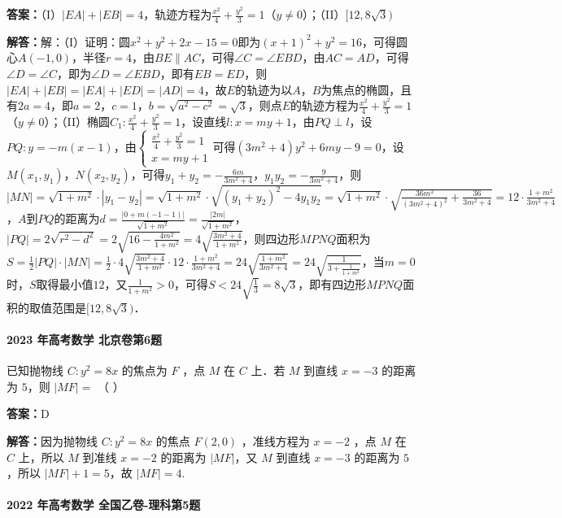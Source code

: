 \documentclass[UTF8,a4paper,11pt]{ctexart}
\begin{document}
\textbf{答案：}（I）$|EA|+|EB|=4$，轨迹方程为$\frac{x^2}{4}+\frac{y^2}{3}=1$（$y\neq0$）；（II）$[12,8\sqrt{3})$\par

\textbf{解答：}解：（I）证明：圆$x^2+y^2+2x-15=0$即为$(x+1)^2+y^2=16$，可得圆心$A(-1,0)$，半径$r=4$，由$BE\parallel AC$，可得$\angle C=\angle EBD$，由$AC=AD$，可得$\angle D=\angle C$，即为$\angle D=\angle EBD$，即有$EB=ED$，则$|EA|+|EB|=|EA|+|ED|=|AD|=4$，故$E$的轨迹为以$A$，$B$为焦点的椭圆，且有$2a=4$，即$a=2$，$c=1$，$b=\sqrt{a^2-c^2}=\sqrt{3}$，则点$E$的轨迹方程为$\frac{x^2}{4}+\frac{y^2}{3}=1$（$y\neq0$）；（II）椭圆$C_1:\frac{x^2}{4}+\frac{y^2}{3}=1$，设直线$l:x=my+1$，由$PQ\perp l$，设$PQ:y=-m(x-1)$，由$\begin{cases}\frac{x^2}{4}+\frac{y^2}{3}=1\\x=my+1\end{cases}$可得$(3m^2+4)y^2+6my-9=0$，设$M(x_1,y_1)$，$N(x_2,y_2)$，可得$y_1+y_2=-\frac{6m}{3m^2+4}$，$y_1y_2=-\frac{9}{3m^2+4}$，则$|MN|=\sqrt{1+m^2}\cdot|y_1-y_2|=\sqrt{1+m^2}\cdot\sqrt{(y_1+y_2)^2-4y_1y_2}=\sqrt{1+m^2}\cdot\sqrt{\frac{36m^2}{(3m^2+4)^2}+\frac{36}{3m^2+4}}=12\cdot\frac{1+m^2}{3m^2+4}$，$A$到$PQ$的距离为$d=\frac{|0+m(-1-1)|}{\sqrt{1+m^2}}=\frac{|2m|}{\sqrt{1+m^2}}$，$|PQ|=2\sqrt{r^2-d^2}=2\sqrt{16-\frac{4m^2}{1+m^2}}=4\sqrt{\frac{3m^2+4}{1+m^2}}$，则四边形$MPNQ$面积为$S=\frac{1}{2}|PQ|\cdot|MN|=\frac{1}{2}\cdot4\sqrt{\frac{3m^2+4}{1+m^2}}\cdot12\cdot\frac{1+m^2}{3m^2+4}=24\sqrt{\frac{1+m^2}{3m^2+4}}=24\sqrt{\frac{1}{3+\frac{1}{1+m^2}}}$，当$m=0$时，$S$取得最小值$12$，又$\frac{1}{1+m^2}>0$，可得$S<24\sqrt{\frac{1}{3}}=8\sqrt{3}$，即有四边形$MPNQ$面积的取值范围是$[12,8\sqrt{3})$．

\paragraph{2023 年高考数学 北京卷第6题}

已知抛物线 $C: y^2 = 8x$ 的焦点为 $F$ ，点 $M$ 在 $C$ 上．若 $M$ 到直线 $x = -3$ 的距离为 $5$，则 $|MF| =$ （ ）

\textbf{答案：}D\par

\textbf{解答：}因为抛物线 $C: y^2 = 8x$ 的焦点 $F(2,0)$ ，准线方程为 $x = -2$ ，点 $M$ 在 $C$ 上，所以 $M$ 到准线 $x = -2$ 的距离为 $|MF|$，又 $M$ 到直线 $x = -3$ 的距离为 $5$，所以 $|MF| + 1 = 5$，故 $|MF| = 4$.

\paragraph{2022 年高考数学 全国乙卷-理科第5题}
\end{document}
